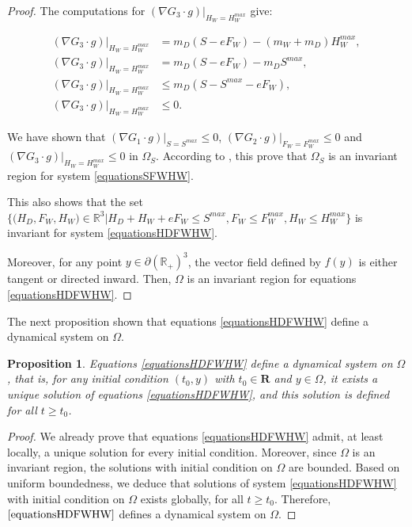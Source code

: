 \documentclass{article}
\newtheorem{prop}{Proposition}
\begin{document}
\begin{proof}
The computations for $(\nabla G_3 \cdot g)|_{H_W = H_W^{max}}$ give:

\begin{align*}
(\nabla G_3 \cdot g)|_{H_W = H_W^{max}} &= m_D (S - eF_W) - (m_W + m_D) H_W^{max}, \\
(\nabla G_3 \cdot g)|_{H_W = H_W^{max}} &= m_D (S - eF_W) - m_D S^{max}, \\
(\nabla G_3 \cdot g)|_{H_W = H_W^{max}} & \leq m_D (S - S^{max} -  eF_W), \\
(\nabla G_3 \cdot g)|_{H_W = H_W^{max}} & \leq 0.
\end{align*}

We have shown that $(\nabla G_1 \cdot g)|_{S = S^{max}} \leq 0$, $(\nabla G_2 \cdot g)|_{F_W = F_W^{max}} \leq 0$ and $(\nabla G_3 \cdot g)|_{H_W = H_W^{max}} \leq 0$ in  $\Omega_S$.  According to \cite{smoller_shock_1994}, this prove that $\Omega_S$ is an invariant region for system \eqref{equationsSFWHW}.

This also shows that the set  $\Big\{\Big(H_D, F_W, H_W \Big) \in \mathbb{R}^3  \Big|H_D + H_W + eF_W \leq S^{max}, F_W \leq F_W^{max}, H_W \leq H_W^{max} \Big\}$ is invariant for system \eqref{equationsHDFWHW}. 


Moreover, for any point $y \in \partial (\mathbb{R}_+)^3$, the vector field defined by $f(y)$ is either tangent or directed inward. Then, $\Omega$ is an invariant region for equations \eqref{equationsHDFWHW}. 

\end{proof}

The next proposition shown that equations \eqref{equationsHDFWHW} define a dynamical system on $\Omega$.

\begin{prop}
Equations \eqref{equationsHDFWHW} define a dynamical system on $\Omega$, that is, for any initial condition $(t_0, y)$ with $t_0 \in \mathbf{R}$ and $y \in \Omega$, it exists a unique solution of equations \eqref{equationsHDFWHW}, and this solution is defined for all $t \geq t_0$.
\end{prop}

\begin{proof}
We already prove that equations \eqref{equationsHDFWHW} admit, at least locally, a unique solution for every initial condition. Moreover, since $\Omega$ is an invariant region, the solutions with initial condition on $\Omega$ are bounded. Based on uniform boundedness, we deduce that solutions of system \eqref{equationsHDFWHW} with initial condition on $\Omega$ exists globally, for all $t\geq t_0$. Therefore, $\eqref{equationsHDFWHW}$ defines a dynamical system on $\Omega$.
\end{proof}
\end{document}
